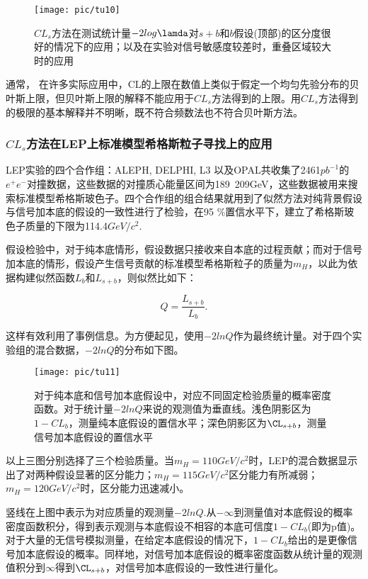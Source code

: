 \begin{figure}[ht]
	\centering
	\texttt{[image: pic/tu10]}
	\caption{${CL}_{s}$方法在测试统计量$-2log\lamda$对$s+b$和$b$假设(顶部)的区分度很好的情况下的应用；以及在实验对信号敏感度较差时，重叠区域较大时的应用}
	\label{fig:10}
\end{figure}

通常， 在许多实际应用中，CL的上限在数值上类似于假定一个均匀先验分布的贝叶斯上限，但贝叶斯上限的解释不能应用于${CL}_{s}$方法得到的上限。用${CL}_{s}$方法得到的极限的基本解释并不明晰，既不符合频数法也不符合贝叶斯方法。

\subsubsection{${CL}_{s}$方法在LEP上标准模型希格斯粒子寻找上的应用}

LEP实验的四个合作组：ALEPH, DELPHI, L3 以及OPAL共收集了2461$pb^{-1}$的$e^{+}e^{-}$对撞数据，这些数据的对撞质心能量区间为189~209GeV，这些数据被用来搜索标准模型希格斯玻色子。四个合作组的组合结果就用到了似然方法对纯背景假设与信号加本底的假设的一致性进行了检验，在95	$\%$置信水平下，建立了希格斯玻色子质量的下限为114.4$GeV/c^{2}$.

假设检验中，对于纯本底情形，假设数据只接收来自本底的过程贡献；而对于信号加本底的情形，假设产生信号贡献的标准模型希格斯粒子的质量为$m_{H}$，以此为依据构建似然函数$L_{b}$和$L_{s+b}$，则似然比如下：

\begin{equation}\label{key}
Q = \frac{L_{s+b}} {L_{b}}.
\end{equation}

这样有效利用了事例信息。为方便起见，使用$-2lnQ$作为最终统计量。对于四个实验组的混合数据，$-2lnQ$的分布如下图。

\begin{figure}[ht]
	\centering
	\texttt{[image: pic/tu11]}
	\caption{对于纯本底和信号加本底假设中，对应不同固定检验质量的概率密度函数。对于统计量$-2lnQ$来说的观测值为垂直线。浅色阴影区为$1-CL_{b}$，测量纯本底假设的置信水平；深色阴影区为$\CL_{s+b}$，测量信号加本底假设的置信水平}
	\label{fig:11}
\end{figure}

以上三图分别选择了三个检验质量。当$m_{H}=110GeV/c^{2}$时，LEP的混合数据显示出了对两种假设显著的区分能力；$m_{H}=115GeV/c^{2}$区分能力有所减弱；$m_{H}=120GeV/c^{2}$时，区分能力迅速减小。

竖线在上图中表示为对应质量的观测量$-2lnQ$.从$-\infty$到测量值对本底假设的概率密度函数积分，得到表示观测与本底假设不相容的本底可信度$1-CL_{b}$(即为p值)。对于大量的无信号模拟测量，在给定本底假设的情况下，$1-CL_{b}$给出的是更像信号加本底假设的概率。同样地，对信号加本底假设的概率密度函数从统计量的观测值积分到$\infty$得到$\CL_{s+b}$，对信号加本底假设的一致性进行量化。

